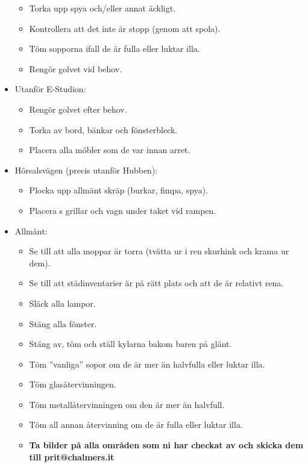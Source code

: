\begin{itemize}
   \begin{itemize}
     \item Torka upp spya och/eller annat äckligt.
     \item Kontrollera att det inte är stopp (genom att spola).
     \item Töm sopporna ifall de är fulla eller luktar illa.
     \item Rengör golvet vid behov. 
   \end{itemize}
   \item Utanför E-Studion:
   \begin{itemize}
     \item Rengör golvet efter behov.
     \item Torka av bord, bänkar och fönsterbleck.
     \item Placera alla möbler som de var innan arret.
   \end{itemize}
   \newpage
   \item Hörsalsvägen (precis utanför Hubben):
   \begin{itemize}
     \item Plocka upp allmänt skräp (burkar, fimpa, spya).
     \item Placera \prit{}s grillar och vagn under taket vid rampen.
   \end{itemize}
   \item Allmänt:
   \begin{itemize}
     \item Se till att alla moppar är torra (tvätta ur i ren skurhink och krama ur dem).
     \item Se till att städinventarier är på rätt plats och att de är relativt rena.
     \item Släck alla lampor.
     \item Stäng alla fönster.
     \item Stäng av, töm och ställ kylarna bakom baren på glänt.
     \item Töm ''vanliga'' sopor om de är mer än halvfulla eller luktar illa.
     \item Töm glasåtervinningen.
     \item Töm metallåtervinningen om den är mer än halvfull.
     \item Töm all annan återvinning om de är fulla eller luktar illa.
     \item \textbf{Ta bilder på alla områden som ni har checkat av och skicka dem till prit@chalmers.it}
   \end{itemize}
 \end{itemize}
